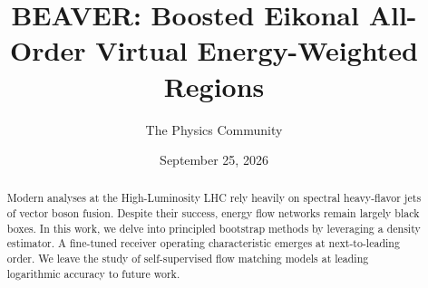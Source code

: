 \documentclass[11pt]{article}
\title{BEAVER: Boosted Eikonal All-Order Virtual Energy-Weighted Regions}
\author{The Physics Community}
\date{September 25, 2026}
\numberwithin{equation}{section}
\theoremstyle{definition}
\theoremstyle{remark}
\begin{document}
\maketitle
\begin{abstract}
Modern analyses at the High-Luminosity LHC rely heavily on spectral
heavy-flavor jets of vector boson fusion. Despite their success, energy
flow networks remain largely black boxes. In this work, we delve into
principled bootstrap methods by leveraging a density estimator. A
fine-tuned receiver operating characteristic emerges at next-to-leading
order. We leave the study of self-supervised flow matching models at
leading logarithmic accuracy to future work.
\end{abstract}
\tableofcontents




\nocite{*}


\end{document}
